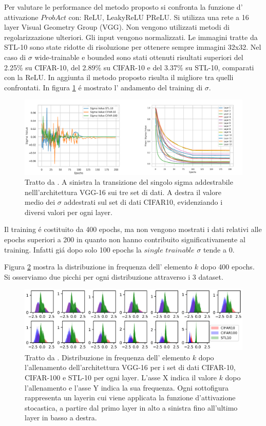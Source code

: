 \documentclass[a4paper,12pt]{report}
\begin{document}
  Per valutare le performance del metodo proposto si confronta la funzione d' attivazione $ProbAct$ con: ReLU, LeakyReLU  PReLU. Si utilizza una rete a 16 layer Visual Geometry Group (VGG). 
  Non vengono utilizzati metodi di regolarizzazione ulteriori. 
  Gli input vengono normalizzati. 
  Le immagini tratte da STL-10 sono state ridotte di risoluzione per ottenere sempre immagini 32x32.
  Nel caso di $\sigma$ wide-trainable e bounded sono stati ottenuti risultati superiori del 2.25\% su CIFAR-10, del 2.89\% su CIFAR-10 e del 3.37\% su STL-10, comparati con la ReLU. 
  In aggiunta il metodo proposto risulta il migliore tra quelli confrontati.
  In figura \ref{SigmaTrainingpng} \'e mostrato l' andamento del training di $\sigma$. 
  \begin{figure}[h!]
   \centering
   \includegraphics[width=\linewidth]{SigmaTraining.png} 
   \caption{Tratto da \cite{lee2019probact}. A sinistra la transizione del singolo sigma addestrabile nelll'architettura VGG-16 sui tre set di dati. A destra il valore medio dei $\sigma$ addestrati sul set di dati CIFAR10, evidenziando i diversi valori per ogni layer.}
  \label{SigmaTrainingpng}
  \end{figure}

  
  Il training \'e costituito da 400 epochs, ma non vengono mostrati i dati relativi alle epochs superiori a 200 in quanto non hanno contribuito significativamente al training. 
  Infatti gi\'a dopo solo 100 epochs la $single$ $trainable$ $\sigma$ tende a 0. 
  
  Figura \ref{kFreqDistrpng} mostra la distribuzione in frequenza dell' elemento $k$ dopo 400 epochs. 
  Si osserviamo due picchi per ogni distribuzione attraverso i 3 dataset.  
  \begin{figure}[h!]
   \centering
   \includegraphics[width=\linewidth]{kFreqDistr.png} 
   \caption{Tratto da \cite{lee2019probact}. Distribuzione in frequenza dell' elemento $k$ dopo l'allenamento dell'architettura VGG-16 per i set di dati CIFAR-10, CIFAR-100 e STL-10 per ogni layer. L'asse X indica il valore $k$ dopo l'allenamento e l'asse Y indica la sua frequenza. Ogni sottofigura rappresenta un layerin cui viene applicata la funzione d'attivazione stocastica, a partire dal primo layer in alto a sinistra fino all'ultimo layer in basso a destra.}
  \label{kFreqDistrpng}
  \end{figure}
  
\end{document}
